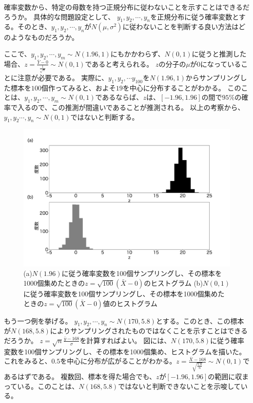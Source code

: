 確率変数から、特定の母数を持つ正規分布に従わないことを示すことはできるだろうか。
具体的な問題設定として、
$y_1,y_2,\cdots,y_n$を正規分布に従う確率変数とする。そのとき、$y_1,y_2,\cdots,y_n$が$N(\mu,\sigma^2)$に従わないことを判断する良い方法はどのようなものだろうか。

ここで、$y_1,y_2,\cdots,y_m \sim N(1.96,1)$にもかかわらず、$N(0,1)$に従うと推測した場合、$z=\frac{\bar{Y}-0}{\frac{1}{\sqrt{n}}} \sim N(0,1)$であると考えられる。
$z$の分子の$\mu$が$0$になっていることに注意が必要である。
実際に、$y_1,y_2,\cdots y_{100}$を$N(1.96,1)$からサンプリングした標本を$100$個作ってみると、およそ$19$を中心に分布することがわかる。
このことは、$y_1,y_2,\cdots,y_m\sim N(0,1)$であるならば、$z$は、$[-1.96,1.96]$の間で$95\%$の確率で入るので、この推測が間違いであることが推測される。
以上の考察から、$y_1,y_2\cdots,y_n\sim N(0,1)$ではないと判断する。

\begin{figure}
    \begin{center}
        \includegraphics[width=15cm]{./image/02_/normal_distribution_test.pdf}
        \caption{(a)$N(1.96)$に従う確率変数を100個サンプリングし、その標本を1000個集めたときの$z=\sqrt{100}(\bar{X}-0)$のヒストグラム (b)$N(0,1)$に従う確率変数を100個サンプリングし、その標本を1000個集めたときの$z=\sqrt{100}(\bar{X}-0)$値のヒストグラム}
    \end{center}
\end{figure}


もう一つ例を挙げる。
$y_1,y_2,\cdots,y_n \sim N(170,5.8)$とする。このとき、この標本が$N(168,5.8)$によりサンプリングされたものではなくことを示すことはできるだろうか。
$z=\sqrt{n}\frac{\bar{y}-168}{\sigma}$を計算すればよい。
図には、$N(170,5.8)$に従う確率変数を100個サンプリングし、その標本を1000個集め、ヒストグラムを描いた。
これをみると、$0.5$を中心に分布が広がることがわかる。$z=\frac{\bar{X}-168}{\sqrt{\frac{5.8}{n}}}\sim N(0,1)$であるはずである。
複数回、標本を得た場合でも、$z$が$[-1.96,1.96]$の範囲に収まっている。このことは、$N(168,5.8)$ではないと判断できないことを示唆している。



